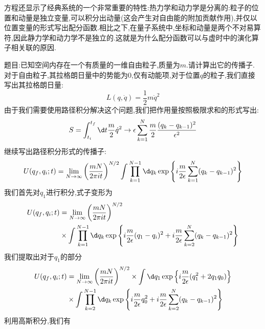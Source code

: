 方程还显示了经典系统的一个非常重要的特性:热力学和动力学是分离的:粒子的位置和动量是独立变量,可以积分出动量(这会产生对自由能的附加贡献作用),并仅以位置变量的形式写出配分函数.相比之下,在量子系统中,坐标和动量是两个不对易算符,因此静力学和动力学不是独立的.这就是为什么配分函数可以与虚时中的演化算子相关联的原因.

\begin{eggg}
	
	{\Large 题目:已知空间内存在一个有质量的一维自由粒子,质量为$ m $.请计算出它的传播子.}\\
	对于自由粒子,其拉格朗日量中的势能为$ 0 $,仅有动能项,对于位置$ q $的粒子,我们直接写出其拉格朗日量:
	\begin{equation}
		L(q,\dot q)=\frac12m\dot q^2
	\end{equation}
	由于我们需要使用路径积分解决这个问题,我们把作用量按照极限求和的形式写出:
	\begin{equation}
		S=\int_{t_i}^{t_f} \d t\frac{m}{2}\dot{q}^2\to \epsilon\sum_{k=1}^N\frac{m}{2}\frac{(q_k-q_{k-1})^2}{\epsilon^2}
	\end{equation}
	继续写出路径积分形式的传播子:
	\begin{equation}
		U(q_f,q_i;t)=\lim_{N\to\infty}\left(\frac{mN}{2\pi it}\right)^{N/2}\int\prod_{k=1}^{N-1}\d q_k\exp\left\{i\frac{m}{2\epsilon}\sum_{k=1}^N(q_k-q_{k-1})^2\right\}
	\end{equation}
	我们首先对$q_1$进行积分,式子变形为
	\begin{equation}
		\begin{aligned}
			U(q_f,q_i;t) & =\lim_{N\to\infty}\left(\frac{mN}{2\pi it}\right)^{N/2} \\
			& \times\int\prod_{k=1}^{N-1}\d q_k\exp\left\{i\frac{m}{2\epsilon}(q_1-q_i)^2+i\frac{m}{2\epsilon}\sum_{k=2}^N(q_k-q_{k-1})^2\right\}
		\end{aligned}
	\end{equation}
	我们提取出对于$ q_1 $的部分
	\begin{equation}
	\begin{aligned}
		U(q_f,q_i;t) & =\lim_{N\to\infty}\left(\frac{mN}{2\pi it}\right)^{N/2}\times\int\d q_1\exp\left\{i\frac{m}{2\epsilon}(q_1^2+2q_1q_0)\right\} \\
		& \times\int\prod_{k=2}^{N-1}\d q_k\exp\left\{i\frac{m}{2\epsilon}q_0^2+i\frac{m}{2\epsilon}\sum_{k=2}^N(q_k-q_{k-1})^2\right\}
	\end{aligned}
	\end{equation}
	利用高斯积分,我们有
	\begin{equation}
		\begin{aligned}

\end{aligned}
\end{equation}
\end{eggg}
